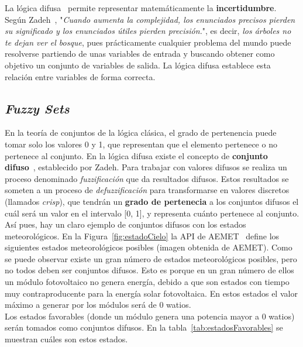 La lógica difusa~\cite{Morc11} permite representar matemáticamente la \textbf{incertidumbre}. Según Zadeh~\cite{Zad73}, "\textit{Cuando aumenta la complejidad, los enunciados precisos pierden su significado y los enunciados útiles pierden precisión.}", es decir, \textit{los árboles no te dejan ver el bosque}, pues prácticamente cualquier problema del mundo puede resolverse partiendo de unas variables de entrada y buscando obtener como objetivo un conjunto de variables de salida. La lógica difusa establece esta relación entre variables de forma correcta.

\subsection{\textit{Fuzzy Sets}}
En la teoría de conjuntos de la lógica clásica, el grado de pertenencia puede tomar solo los valores 0 y 1, que representan que el elemento pertenece o no pertenece al conjunto. En la lógica difusa existe el concepto de \textbf{conjunto difuso}~\cite{Zad65}, establecido por Zadeh. Para trabajar con valores difusos se realiza un proceso denominado \textit{fuzzificación} que da resultados difusos. Estos resultados se someten a un proceso de \textit{defuzzificación} para transformarse en valores discretos (llamados \textit{crisp}), que tendrán un \textbf{grado de pertenecia} a los conjuntos difusos el cuál será un valor en el intervalo [0, 1], y representa cuánto pertenece al conjunto.\\

Así pues, hay un claro ejemplo de conjuntos difusos con los estados meteorológicos. En la Figura~\ref{fig:estadoCielo} la API de AEMET~\cite{Aemet} define los siguientes estados meteorológicos posibles (imagen obtenida de \textcopyright AEMET).
Como se puede observar existe un gran número de estados meteorológicos posibles, pero no todos deben ser conjuntos difusos. Esto es porque en un gran número de ellos un módulo fotovoltaico no genera energía, debido a que son estados con tiempo muy contraproducente para la energía solar fotovoltaica. En estos estados el valor máximo a generar por los módulos será de 0 watios.\\Los estados favorables (donde un módulo genera una potencia mayor a 0 watios) serán tomados como conjuntos difusos. En la tabla~\ref{tab:estadosFavorables} se muestran cuáles son estos estados.

